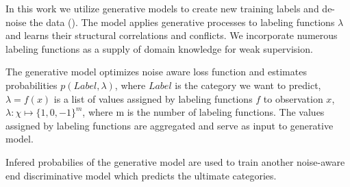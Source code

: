 
In this work we utilize generative models to create new training labels and de-noise the data (\cite{Ratner2016}).
The model applies generative processes to labeling functions $\lambda$ and learns their structural correlations and conflicts.
We incorporate numerous labeling functions as a supply of domain knowledge for weak supervision.

The generative model optimizes noise aware loss function and estimates probabilities $p(Label, \lambda)$,
where $Label$ is the category we want to predict, $\lambda = f(x)$ is a list of values assigned by labeling
functions $f$ to observation $x$, $\lambda : \chi \mapsto \{1, 0, -1\}^m$, where m is the number of labeling functions.
The values assigned by labeling functions are aggregated and serve as input to generative model.

Infered probabilies of the generative model are used to train another noise-aware end discriminative model which
predicts the ultimate categories.

